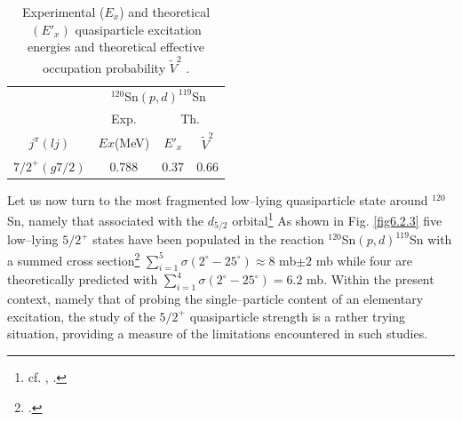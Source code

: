     \begin{table}
    \centering
    \begin{tabular}{|c|c|c|c|}
\hline
&\multicolumn{3}{c|}{$^{120}$Sn$(p,d)^{119}$Sn}\\
\cline{2-4}
&Exp.&\multicolumn{2}{|c|}{Th.}\\
\hline
$j^{\pi}(lj)$& $Ex$(MeV)& $E'_x$&$\tilde V^2$\\
\hline
$7/2^+(g7/2)$&0.788&0.37&0.66\\
\hline
    \end{tabular}\caption{Experimental ($E_x$) and theoretical $(E'_x)$ quasiparticle excitation energies and theoretical effective occupation probability $\tilde V^2$ \cite{Idini:15}.}\label{tab4.2.1}
    \end{table}
    
    
  Let us now turn to the most fragmented low--lying quasiparticle state around $^{120}$Sn, namely that associated with the $d_{5/2}$ orbital\footnote{cf. \cite{Idini:13}, \cite{Idini:15}.} As shown in Fig. \ref{fig6.2.3} five low--lying $5/2^+$ states have been populated in the 	reaction  $^{120}$Sn$(p,d)^{119}$Sn with a summed cross section\footnote{\cite{Dickey:82}.} $\sum_{i=1}^5 \sigma(2^\circ-25^\circ)\approx 8$ mb$\pm 2$ mb  while four are theoretically predicted with $\sum_{i=1}^4\sigma(2^\circ-25^\circ)= 6.2$ mb.
  Within the  present context, namely that of probing the single--particle 	content of an elementary excitation, the study of the $5/2^+$ quasiparticle strength is a rather trying situation, providing a measure of the limitations encountered in such studies. 
  
